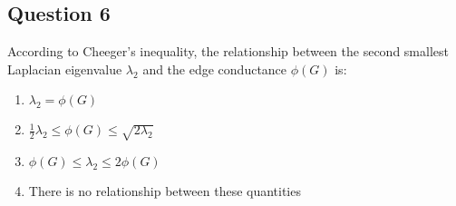 \documentclass[11pt]{article}
\begin{document}
\subsection{Question 6}
According to Cheeger's inequality, the relationship between the second smallest Laplacian eigenvalue $\lambda_2$ and the edge conductance $\phi(G)$ is:

\begin{enumerate}[label=(\Alph*)]
    \item $\lambda_2 = \phi(G)$
    \item $\frac{1}{2}\lambda_2 \leq \phi(G) \leq \sqrt{2\lambda_2}$
    \item $\phi(G) \leq \lambda_2 \leq 2\phi(G)$
    \item There is no relationship between these quantities
\end{enumerate}
\end{document}
